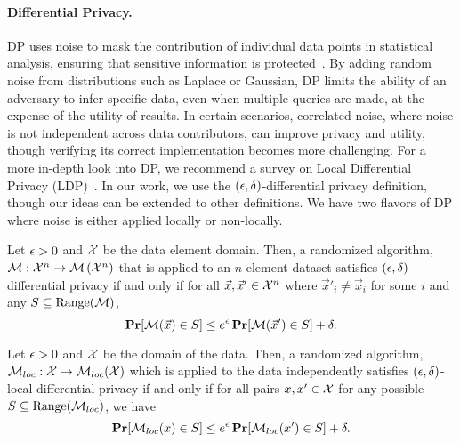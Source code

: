 \documentclass[11pt]{article}
\begin{document}
\paragraph{Differential Privacy.}
DP uses noise to mask the contribution of individual data points in statistical analysis, ensuring that sensitive information is protected~\cite{dwork2006differential}. 
By adding random noise from distributions such as Laplace or Gaussian, DP limits the ability of an adversary to infer specific data, even when multiple queries are made, at the expense of the utility of results. 
In certain scenarios, correlated noise, where noise is not independent across data contributors, can improve privacy and utility, though verifying its correct implementation becomes more challenging.
For a more in-depth look into DP, we recommend a survey on Local Differential Privacy (LDP)~\cite{yang2023local}.
In our work, we use the $(\epsilon, \delta)$-differential privacy definition, though our ideas can be extended to other definitions.
We have two flavors of DP where noise is either applied locally or non-locally.


\begin{definition}
	Let $\epsilon > 0$ and $\mathcal{X}$ be the data element domain.
	Then, a randomized algorithm, $\mathcal{M} : \mathcal{X}^n \rightarrow \mathcal{M}\left(\mathcal{X}^n\right)$ that is applied to an $n$-element dataset satisfies $(\epsilon, \delta)$-differential privacy if and only if for all $\vec{x},\vec{x}' \in \mathcal{X}^n$ where $\vec{x}'_i \neq \vec{x}_i$ for some $i$ and any $S \subseteq \text{Range}(\mathcal{M})$,
	\[
		\operatorname*{\mathbf{Pr}}[\mathcal{M}(\vec{x}) \in S] \leq e^\epsilon \operatorname*{\mathbf{Pr}}[\mathcal{M}(\vec{x}') \in S] + \delta.
	\]
\end{definition}


\begin{definition}
	Let $\epsilon > 0$ and $\mathcal{X}$ be the domain of the data.
	Then, a randomized algorithm, $\mathcal{M}_{loc} : \mathcal{X} \rightarrow \mathcal{M}_{loc}(\mathcal{X})$ which is applied to the data independently satisfies $(\epsilon, \delta)$-local differential privacy if and only if for all pairs $x, x' \in \mathcal{X}$
	for any possible $S \subseteq \text{Range}(\mathcal{M}_{loc})$, we have
	\[
		\operatorname*{\mathbf{Pr}}[\mathcal{M}_{loc}(x) \in S] \leq e^\epsilon \operatorname*{\mathbf{Pr}}[\mathcal{M}_{loc}(x') \in S] + \delta.
	\]
\end{definition}
\end{document}
